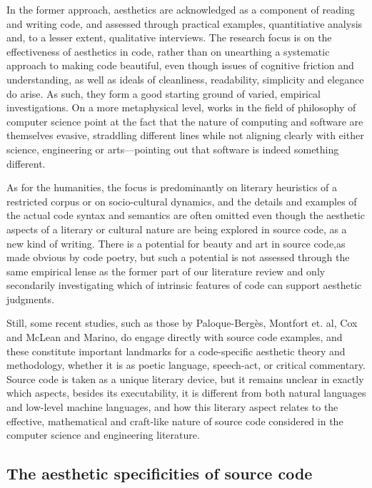 In the former approach, aesthetics are acknowledged as a component of reading and writing code, and assessed through practical examples, quantitiative analysis and, to a lesser extent, qualitative interviews. The research focus is on the effectiveness of aesthetics in code, rather than on unearthing a systematic approach to making code beautiful, even though issues of cognitive friction and understanding, as well as ideals of cleanliness, readability, simplicity and elegance do arise. As such, they form a good starting ground of varied, empirical investigations.
On a more metaphysical level, works in the field of philosophy of computer science point at the fact that the nature of computing and software are themselves evasive, straddling different lines while not aligning clearly with either science, engineering or arts—pointing out that software is indeed something different.

As for the humanities, the focus is predominantly on literary heuristics of a restricted corpus or on socio-cultural dynamics, and the details and examples of the actual code syntax and semantics are often omitted even though the aesthetic aspects of a literary or cultural nature are being explored in source code, as a new kind of writing. There is a potential for beauty and art in source code,as made obvious by code poetry, but such a potential is not assessed through the same empirical lense as the former part of our literature review and only secondarily investigating which of intrinsic features of code can support aesthetic judgments.

Still, some recent studies, such as those by Paloque-Bergès, Montfort et. al, Cox and McLean and Marino, do engage directly with source code examples, and these constitute important landmarks for a code-specific aesthetic theory and methodology, whether it is as poetic language, speech-act, or critical commentary. Source code is taken as a unique literary device, but it remains unclear in exactly which aspects, besides its executability, it is different from both natural languages and low-level machine languages, and how this literary aspect relates to the effective, mathematical and craft-like nature of source code considered in the computer science and engineering literature.

\subsection{The aesthetic specificities of source code}

